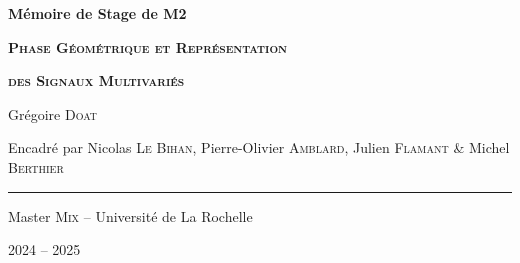 




	
	
	
	
	
	
\begin{titlepage}
	
	\centering
	\vspace{1.5cm}
	{\huge\textbf{Mémoire de Stage de M2}}\par
	
	\vspace{2cm}
	{\huge\textbf{\textsc{Phase Géométrique et Représentation}}}\par 
	\vspace{0.5cm}
	
	{\huge\textbf{\textsc{des Signaux Multivariés}}}\par
	\vspace{2.0cm}
	
	{\large Grégoire \textsc{Doat}}\par
	\vspace{0.5cm}
	\vfill
	
	{\large Encadré par Nicolas \textsc{Le Bihan}, Pierre-Olivier \textsc{Amblard}, Julien \textsc{Flamant} \& Michel \textsc{Berthier}}\par
	\vspace{0.5cm}
	
	\rule{10cm}{0.4pt}\par
	\vspace{0.7cm}
	
	{Master \textsc{Mix} -- Université de La Rochelle}\par
	\vspace{0.25cm}
	
	{\large 2024 -- 2025}
\end{titlepage}
	
	
	
